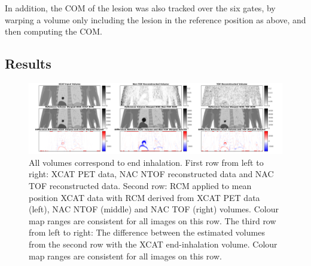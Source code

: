                 In addition, the \gls{COM} of the lesion was also tracked over the six gates, by warping a volume only including the lesion in the reference position as above, and then computing the \gls{COM}.
            
        \subsection{Results} \label{sec:impact_of_tof_on_respiratory_motion_modelling_using_nac_pet_results}
            \begin{figure}
                \centering
                
                \includegraphics[width=1.0\linewidth]{figures/result_1_output.png}
                
                \captionsetup{singlelinecheck=false, justification=raggedright}
                \caption{All volumes correspond to end inhalation. First row from left to right: \gls{XCAT} \gls{PET} data, \gls{NAC} \gls{NTOF} reconstructed data and \gls{NAC} \gls{TOF} reconstructed data. Second row: \gls{RCM} applied to mean position \gls{XCAT} data with \gls{RCM} derived from \gls{XCAT} \gls{PET} data (left), \gls{NAC} \gls{NTOF} (middle) and \gls{NAC} \gls{TOF} (right) volumes. Colour map ranges are consistent for all images on this row. The third row from left to right: The difference between the estimated volumes from the second row with the \gls{XCAT} end-inhalation volume. Colour map ranges are consistent for all images on this row.} \label{fig:impact_of_tof_on_respiratory_motion_modelling_using_nac_pet_results_output}
            \end{figure}
            
